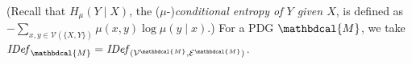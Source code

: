 \documentclass[letterpaper]{article} %
\theoremstyle{plain}
\theoremstyle{definition}
\theoremstyle{remark}
\newcommand{\V}{\mathcal V}
\newcommand{\Ed}{\mathcal E}
\newcommand{\dg}[1]{\mathbdcal{#1}}
\newcommand{\IDef}[1]{\mathit{IDef}_{#1}}
\begin{document}
\begin{defn}
(Recall that $H_\mu(Y\mid X)$, the
	($\mu$-)\emph{conditional entropy of $Y$ given $X$}, is
	defined as 
$- \sum_{x,y \in \V(\{X,Y\})} \mu(x,y) \log \mu(y\mid x)$.)
For a PDG ${\dg M}$, we take $\IDef{\dg M} = \IDef{(\V^{\dg M}, \Ed^{\dg M})}$.  

\end{defn}
\end{document}
